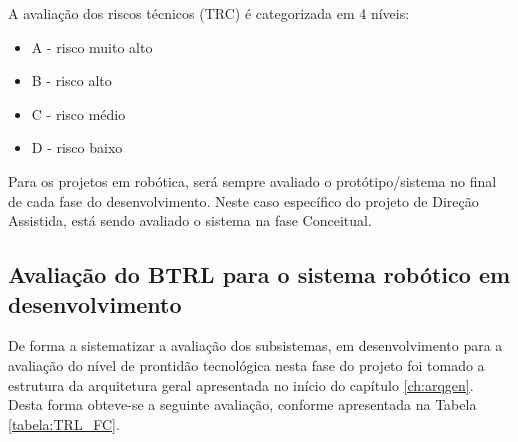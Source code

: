 A avaliação dos riscos técnicos (TRC) é categorizada em 4 níveis:
\begin{itemize}
	\item A - risco muito alto
	\item B - risco alto
	\item C - risco médio
	\item D - risco baixo
\end{itemize}

Para os projetos em robótica, será sempre avaliado o protótipo/sistema no final de cada fase do desenvolvimento. Neste caso específico do projeto de Direção Assistida, está sendo avaliado o sistema na fase Conceitual.

\subsection{Avaliação do BTRL para o sistema robótico em desenvolvimento}
De forma a sistematizar a avaliação dos subsistemas, em desenvolvimento para a avaliação do nível de prontidão tecnológica nesta fase do projeto foi tomado a estrutura da arquitetura geral apresentada no início do capítulo \ref{ch:arqgen}.
Desta forma obteve-se a seguinte avaliação, conforme apresentada na Tabela \ref{tabela:TRL_FC}.

